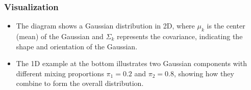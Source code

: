 \subsubsection{Visualization}
\begin{intuition}
    \begin{itemize}
        \item  The diagram shows a Gaussian distribution in 2D, where \( \mu_k \) is the center (mean) of the Gaussian and \( \Sigma_k \) represents the covariance, indicating the shape and orientation of the Gaussian.
        \item The 1D example at the bottom illustrates two Gaussian components with different mixing proportions \( \pi_1 = 0.2 \) and \( \pi_2 = 0.8 \), showing how they combine to form the overall distribution.
    \end{itemize}

\end{intuition}

